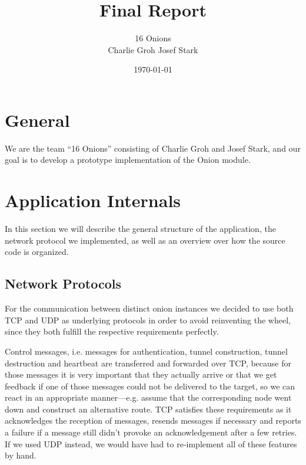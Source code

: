 \documentclass{article}
\begin{document}
\title{\Huge Final Report \normalsize}
\date{\today}
\author{\LARGE 16 Onions \normalsize \\[5pt] Charlie Groh \hspace{20pt} Josef Stark}
\maketitle
{\let\thefootnote\relax{}}

\section{General}
We are the team ``16 Onions'' consisting of Charlie Groh and Josef Stark,
and our goal is to develop a prototype implementation of the Onion module.

\section{Application Internals}
In this section we will describe the general structure of the application, the network protocol we implemented, as well as an overview over how the source code is organized.

\subsection{Network Protocols}
For the communication between distinct onion instances we decided to use both TCP and UDP as underlying protocols in order to avoid reinventing the wheel, since they both fulfill the respective requirements perfectly.

Control messages, i.e. messages for authentication, tunnel construction, tunnel destruction and heartbeat are transferred and forwarded over TCP, because for those messages it is very important that they actually arrive or that we get feedback if one of those messages could not be delivered to the target, so we can react in an appropriate manner---e.g. assume that the corresponding node went down and construct an alternative route. TCP satisfies these requirements as it acknowledges the reception of messages, resends messages if necessary and reports a failure if a message still didn't provoke an acknowledgement after a few retries. If we used UDP instead, we would have had to re-implement all of these features by hand. 
\end{document}
